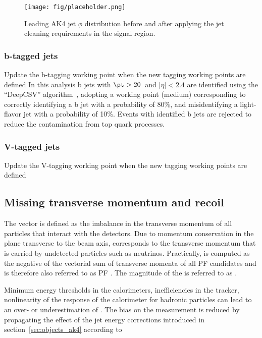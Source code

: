 \begin{figure}[htbp]
  \centering
        \texttt{[image: fig/placeholder.png]}
  \caption{Leading AK4 jet $\phi$ distribution before and after applying the jet cleaning
requirements in the signal region.}
  \label{fig:jetcleaning}
\end{figure}


\subsubsection{b-tagged jets}

{\color{red} Update the b-tagging working point when the new tagging working points are defined}
In this analysis b jets with $\pt > 20$~\GeV and $|\eta| < 2.4$ are identified
using the ``DeepCSV'' algorithm~\cite{Sirunyan:2017ezt},
adopting a working point (medium) corresponding to correctly identifying a b jet with a
probability of 80\%, and misidentifying a light-flavor jet with a probability of 10\%.
Events with identified b jets are rejected to reduce the contamination from top quark processes.

\subsubsection{V-tagged jets}

{\color{red} Update the V-tagging working point when the new tagging working points are defined}

\subsection{Missing transverse momentum and recoil}

The vector \ptvecmiss is defined as the imbalance in the transverse
momentum of all particles that interact with the detectors.
Due to momentum conservation in the plane transverse to the beam axis, \ptvecmiss
corresponds to the transverse momentum that is carried by undetected particles such as neutrinos.
Practically, \ptvecmiss is computed as the negative of the vectorial sum of transverse
momenta of all PF candidates and is therefore also referred to as PF \ptvecmiss. The magnitude of the \ptvecmiss is referred to as \ptmiss.

Minimum energy thresholds in the calorimeters, inefficiencies
in the tracker, nonlinearity of the response of the calorimeter
for hadronic particles can lead to an over- or underestimation of \ptmiss.
The bias on the \ptmiss measurement is reduced by propagating the effect of the jet energy
corrections introduced in section~\ref{sec:objects_ak4} according to

